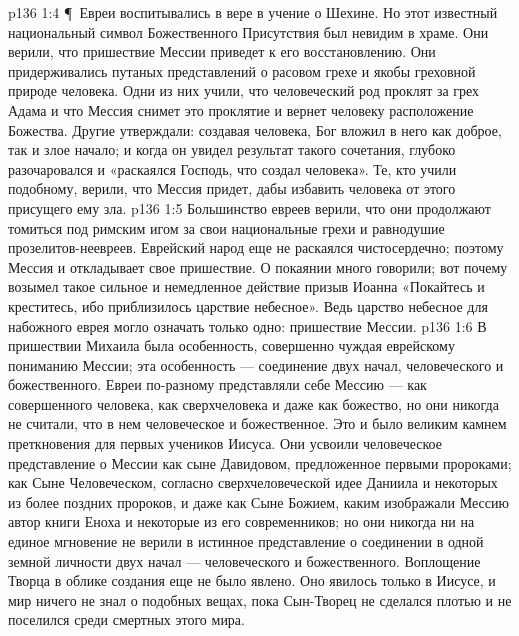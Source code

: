\vs p136 1:4 \P\ Евреи воспитывались в вере в учение о Шехине. Но этот известный национальный символ Божественного Присутствия был невидим в храме. Они верили, что пришествие Мессии приведет к его восстановлению. Они придерживались путаных представлений о расовом грехе и якобы греховной природе человека. Одни из них учили, что человеческий род проклят за грех Адама и что Мессия снимет это проклятие и вернет человеку расположение Божества. Другие утверждали: создавая человека, Бог вложил в него как доброе, так и злое начало; и когда он увидел результат такого сочетания, глубоко разочаровался и «раскаялся Господь, что создал человека». Те, кто учили подобному, верили, что Мессия придет, дабы избавить человека от этого присущего ему зла.
\vs p136 1:5 Большинство евреев верили, что они продолжают томиться под римским игом за свои национальные грехи и равнодушие прозелитов\hyp{}неевреев. Еврейский народ еще не раскаялся чистосердечно; поэтому Мессия и откладывает свое пришествие. О покаянии много говорили; вот почему возымел такое сильное и немедленное действие призыв Иоанна «Покайтесь и креститесь, ибо приблизилось царствие небесное». Ведь царство небесное для набожного еврея могло означать только одно: пришествие Мессии.
\vs p136 1:6 В пришествии Михаила была особенность, совершенно чуждая еврейскому пониманию Мессии; эта особенность --- соединение двух начал, человеческого и божественного. Евреи по\hyp{}разному представляли себе Мессию --- как совершенного человека, как сверхчеловека и даже как божество, но они никогда не считали, что в нем  человеческое и божественное. Это и было великим камнем преткновения для первых учеников Иисуса. Они усвоили человеческое представление о Мессии как сыне Давидовом, предложенное первыми пророками; как Сыне Человеческом, согласно сверхчеловеческой идее Даниила и некоторых из более поздних пророков, и даже как Сыне Божием, каким изображали Мессию автор книги Еноха и некоторые из его современников; но они никогда ни на единое мгновение не верили в истинное представление о соединении в одной земной личности двух начал --- человеческого и божественного. Воплощение Творца в облике создания еще не было явлено. Оно явилось только в Иисусе, и мир ничего не знал о подобных вещах, пока Сын\hyp{}Творец не сделался плотью и не поселился среди смертных этого мира.
